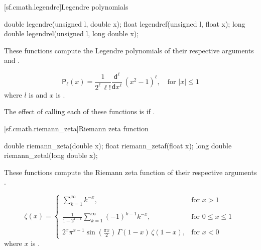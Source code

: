 [sf.cmath.legendre]{Legendre polynomials}%
%
%
%
%
%
\begin{itemdecl}
double       legendre(unsigned l, double x);
float        legendref(unsigned l, float x);
long double  legendrel(unsigned l, long double x);
\end{itemdecl}

\begin{itemdescr}

\pnum\effects
These functions compute the Legendre polynomials of their
respective arguments
 and .

\pnum\returns
\[%
  \mathsf{P}_\ell(x) =
  \frac{1}
       {2^\ell \, \ell!}
  \frac{ \mathsf{d} ^ \ell}
       { \mathsf{d}x ^ \ell} \, (x^2 - 1) ^ \ell,
	   \quad \mbox{for $|x| \le 1$}
\]
where
$l$ is  and
$x$ is .

\pnum\remarks
The effect of calling each of these functions
is 
if .
\end{itemdescr}

[sf.cmath.riemann_zeta]{Riemann zeta function}%
%
%
%
%
\begin{itemdecl}
double       riemann_zeta(double x);
float        riemann_zetaf(float x);
long double  riemann_zetal(long double x);
\end{itemdecl}

\begin{itemdescr}

\pnum\effects
These functions compute the Riemann zeta function
of their respective arguments
.

\pnum\returns
\[%
  \mathsf{\zeta}(x) =
  \left\{
  \begin{array}{cl}
  \displaystyle
  \sum_{k=1}^\infty k^{-x},
  & \mbox{for $x > 1$}
  \\
  \\
  \displaystyle
  \frac{1}
	{1 - 2^{1-x}}
  \sum_{k=1}^\infty (-1)^{k-1} k^{-x},
  & \mbox{for $0 \le x \le 1$}
  \\
  \\
  \displaystyle
  2^x \pi^{x-1} \sin(\frac{\pi x}{2}) \, \Gamma(1-x) \, \zeta(1-x),
  & \mbox{for $x < 0$}
  \end{array}
  \right.
\;
\]
where
$x$ is .
\end{itemdescr}

